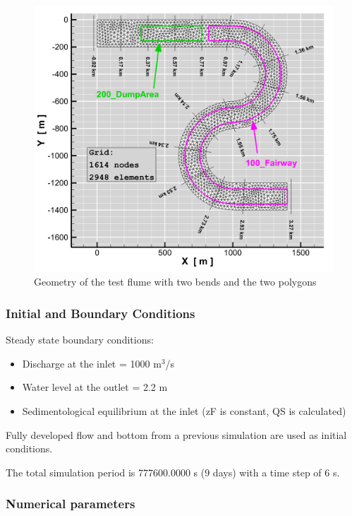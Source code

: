 \begin{figure} [!h]
\centering
\includegraphics[scale=0.14]{../img/critDig_grid_Polys_2D.png}
\caption{Geometry of the test flume with two bends and the two polygons}\label{grid}
\end{figure}


%
%
\subsubsection{Initial and Boundary Conditions}
%
Steady state boundary conditions:
\begin{itemize}
\item{ Discharge at the inlet = 1000 m$^3$/s}
\item Water level at the outlet = 2.2 m
\item Sedimentological equilibrium at the inlet (zF is constant, QS is calculated)
\end{itemize}
Fully developed flow and bottom from a previous simulation are used as initial conditions.

The total simulation period is 777600.0000 s (9 days) with a time step of 6 s. 
%
%
\subsubsection{Numerical parameters}
%
%
%
